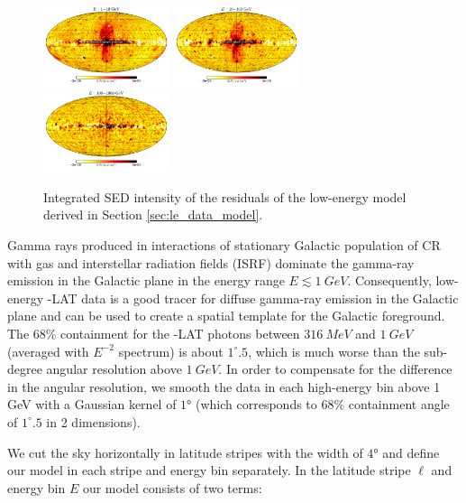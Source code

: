 \begin{figure}[t]
\includegraphics[width=0.33\textwidth]{plots/Mollweide_LowE_03-10GeV_flux_source_range_0.pdf}
\includegraphics[width=0.33\textwidth]{plots/Mollweide_LowE_03-10GeV_flux_source_range_1.pdf}
\includegraphics[width=0.33\textwidth]{plots/Mollweide_LowE_03-10GeV_flux_source_range_2.pdf}
\caption{Integrated SED intensity of the residuals of the low-energy model derived in Section \ref{sec:le_data_model}. }
\label{fig:Maps_lowE}
\end{figure}

Gamma rays produced in interactions of stationary Galactic population of CR with gas and interstellar radiation fields (ISRF)
dominate the gamma-ray emission in the Galactic plane in the energy range $E \lesssim \SI{1}{GeV}$. 
Consequently, low-energy \Fermi-LAT data is a good tracer for diffuse gamma-ray emission in the Galactic plane and can be used to create a spatial template for the Galactic foreground.
The 68\% containment for the \Fermi-LAT photons between $\SI{316}{MeV}$ and $\SI{1}{GeV}$ (averaged with $E^{-2}$ spectrum) is about $1^\circ\!\!.5$,
which is much worse than the sub-degree angular resolution above $\SI{1}{GeV}$.
In order to compensate for the difference in the angular resolution, 
we smooth the data in each high-energy bin above 1 GeV
with a Gaussian kernel of $\ang{1}$ (which corresponds to $68\%$ containment angle of
$1^\circ\!\!.5$ in 2 dimensions).

We cut the sky horizontally in latitude stripes with the width of $\ang{4}$ and define our model in each stripe and energy bin separately. 
In the latitude stripe $\ell$ and energy bin $E$ our model consists of two terms:

